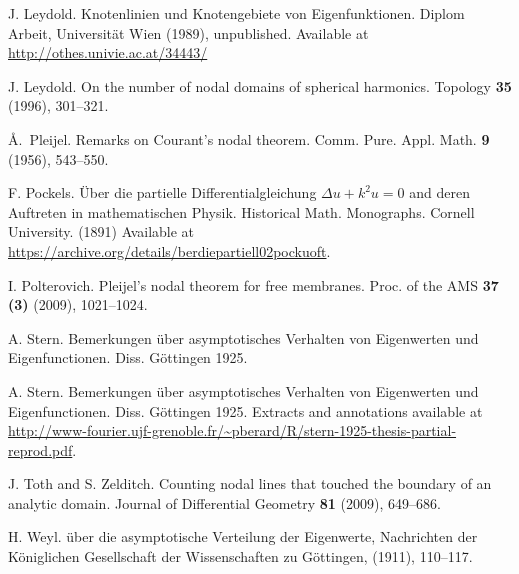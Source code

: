 \documentclass[a4paper,reqno,11pt]{amsart}
\theoremstyle{remark}
\theoremstyle{definition}
\numberwithin{equation}{section}
\begin{document}
\begin{thebibliography}{1}
 J. Leydold.
\newblock Knotenlinien und Knotengebiete von Eigenfunktionen.
\newblock Diplom Arbeit, Universit\"at Wien (1989), unpublished. Available at \url{http://othes.univie.ac.at/34443/}

 J. Leydold.
 \newblock On the number of nodal domains of spherical harmonics.
\newblock Topology {\bf 35} (1996), 301--321.

 \AA.~Pleijel. 
\newblock Remarks on Courant's nodal theorem.
\newblock Comm. Pure. Appl. Math. {\bf 9} (1956), 543--550.

 F. Pockels.
\newblock \"Uber die partielle Differentialgleichung $ \Delta u + k^2 u=0$ and deren Auftreten in mathematischen Physik. 
\newblock Historical Math. Monographs. Cornell University. (1891)
\newblock  Available at \url{https://archive.org/details/berdiepartiell02pockuoft}.

 I. Polterovich.
\newblock Pleijel's nodal theorem for free membranes.
\newblock  Proc. of the AMS {\bf 37 (3)} (2009), 1021--1024.

 A. Stern.
\newblock Bemerkungen \"uber asymptotisches Verhalten von Eigenwerten und Eigenfunctionen.
\newblock Diss. G\"ottingen 1925.

 A. Stern.
\newblock Bemerkungen \"uber asymptotisches Verhalten von Eigenwerten und Eigenfunctionen.
\newblock Diss. G\"ottingen 1925.
\newblock Extracts and annotations available at \url{http://www-fourier.ujf-grenoble.fr/~pberard/R/stern-1925-thesis-partial-reprod.pdf}.

 J. Toth and S. Zelditch.
\newblock Counting nodal lines that touched the boundary of an analytic domain.
\newblock  Journal of Differential Geometry {\bf 81} (2009), 649--686.

 H. Weyl.
\newblock \"uber die asymptotische Verteilung der Eigenwerte,
\newblock  Nachrichten der K\"oniglichen Gesellschaft der Wissenschaften zu G\"ottingen, (1911), 110--117.

\end{thebibliography} 
\end{document}
